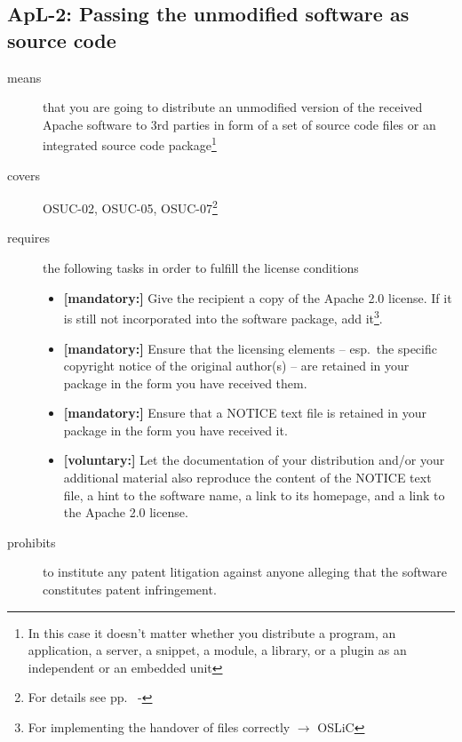\subsection{ApL-2: Passing the unmodified software as source code}
\label{OSUC-02-Apache20} \label{OSUC-05-Apache20} \label{OSUC-07-Apache20} 

\begin{description}
\item[means] that you are going to distribute an unmodified version of the
received Apache software to 3rd parties in form of a set of source code files or
an integrated source code package\footnote{In this case it doesn't matter
whether you  distribute a program, an application, a server, a snippet, a
module, a library, or a plugin as an independent or an embedded unit}

\item[covers] OSUC-02, OSUC-05, OSUC-07\footnote{For details see pp.\ 
\pageref{OSUC-02-DEF} - \pageref{OSUC-07-DEF}}

\item[requires] the following tasks in order to fulfill the license conditions
\begin{itemize}
  \item \textbf{[mandatory:]} Give the recipient a copy of the Apache 2.0
  license. If it is still not incorporated into the software package, add
  it\footnote{For implementing the handover of files correctly $\rightarrow$
  OSLiC \pageref{DistributingFilesHint}}.
  \item \textbf{[mandatory:]} Ensure that the licensing elements -- esp.\ the
  specific copyright notice of the original author(s) -- are retained in your
  package in the form you have received them.
  \item \textbf{[mandatory:]} Ensure that a NOTICE text file is retained in
  your package in the form you have received it.
  \item \textbf{[voluntary:]} Let the documentation of your distribution
  and/or your additional material also reproduce the content of the NOTICE text
  file, a hint to the software name, a link to its homepage, and a link to the
  Apache 2.0 license.
\end{itemize}

\item[prohibits] to institute any patent litigation against anyone alleging that
the software constitutes patent infringement.

\end{description}


